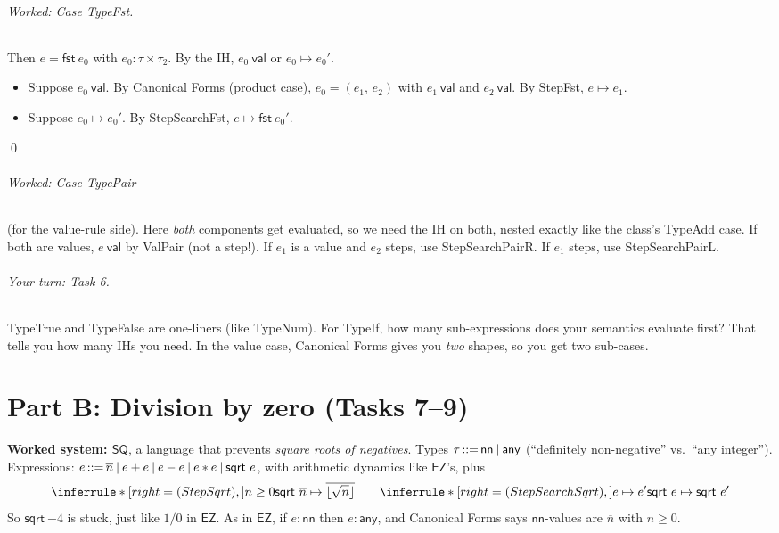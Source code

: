 \documentclass[11pt]{article}
\newcommand{\val}[1]{#1\ \mathsf{val}}
\newcommand{\stepto}[2]{#1 \mapsto #2}
\newcommand{\PAIR}[2]{(#1,\, #2)}
\newcommand{\FST}[1]{\mathsf{fst}\ #1}
\newcommand{\SQRT}[1]{\mathsf{sqrt}\ #1}
\newcommand{\NN}{\mathsf{nn}}
\newcommand{\ANY}{\mathsf{any}}
\newcommand{\num}[1]{\overline{#1}}
\begin{document}
\paragraph{Worked: Case TypeFst.} Then $e=\FST{e_0}$ with
$e_0:\tau\times\tau_2$. By the IH, $\val{e_0}$ or $\stepto{e_0}{e_0'}$.
\begin{itemize}
  \item Suppose $\val{e_0}$. By Canonical Forms (product case),
        $e_0=\PAIR{e_1}{e_2}$ with $\val{e_1}$ and $\val{e_2}$. By StepFst,
        $\stepto{e}{e_1}$.
  \item Suppose $\stepto{e_0}{e_0'}$. By StepSearchFst,
        $\stepto{e}{\FST{e_0'}}$.
\end{itemize}
\qed

\paragraph{Worked: Case TypePair} (for the value-rule side). Here \emph{both}
components get evaluated, so we need the IH on both, nested exactly like the
class's TypeAdd case. If both are values, $\val{e}$ by ValPair (not a step!).
If $e_1$ is a value and $e_2$ steps, use StepSearchPairR. If $e_1$ steps, use
StepSearchPairL.

\paragraph{Your turn: Task 6.} TypeTrue and TypeFalse are one-liners (like
TypeNum). For TypeIf, how many sub-expressions does your semantics evaluate
first? That tells you how many IHs you need. In the value case, Canonical Forms
gives you \emph{two} shapes, so you get two sub-cases.

\newpage
\part*{Part B: Division by zero (Tasks 7--9)}

\textbf{Worked system: $\mathsf{SQ}$}, a language that prevents
\emph{square roots of negatives}. Types $\tau \bnfdef \NN \bnfalt \ANY$
(``definitely non-negative'' vs.\ ``any integer''). Expressions:
$e \bnfdef \num n \bnfalt e+e \bnfalt e-e \bnfalt e*e \bnfalt \SQRT{e}$, with
arithmetic dynamics like $\mathsf{EZ}$'s, plus
\[
  \Rule{StepSqrt}{n\ge 0}{\stepto{\SQRT{\num n}}{\num{\lfloor\sqrt n\rfloor}}}
  \qquad
  \Rule{StepSearchSqrt}{\stepto{e}{e'}}{\stepto{\SQRT{e}}{\SQRT{e'}}}
\]
So $\SQRT{\num{-4}}$ is stuck, just like $\num1/\num0$ in $\mathsf{EZ}$. As
in $\mathsf{EZ}$, if $e:\NN$ then $e:\ANY$, and Canonical Forms says
$\NN$-values are $\num n$ with $n\ge0$.
\end{document}

